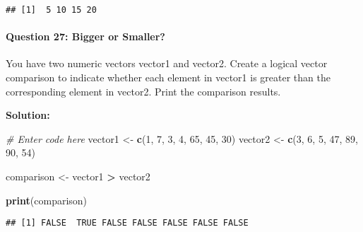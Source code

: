\documentclass[
]{article}
\newenvironment{Shaded}{\begin{snugshade}}{\end{snugshade}}
\newcommand{\CommentTok}[1]{\textcolor[rgb]{0.56,0.35,0.01}{\textit{#1}}}
\newcommand{\DecValTok}[1]{\textcolor[rgb]{0.00,0.00,0.81}{#1}}
\newcommand{\FunctionTok}[1]{\textcolor[rgb]{0.13,0.29,0.53}{\textbf{#1}}}
\newcommand{\NormalTok}[1]{#1}
\newcommand{\OtherTok}[1]{\textcolor[rgb]{0.56,0.35,0.01}{#1}}
\newcommand{\SpecialCharTok}[1]{\textcolor[rgb]{0.81,0.36,0.00}{\textbf{#1}}}
\begin{document}
\begin{verbatim}
## [1]  5 10 15 20
\end{verbatim}

\hypertarget{question-27-bigger-or-smaller}{%
\paragraph{Question 27: Bigger or
Smaller?}\label{question-27-bigger-or-smaller}}

You have two numeric vectors vector1 and vector2. Create a logical
vector comparison to indicate whether each element in vector1 is greater
than the corresponding element in vector2. Print the comparison results.

\textbf{Solution:}

\begin{Shaded}
\begin{Highlighting}[]
\CommentTok{\# Enter code here}
\NormalTok{vector1 }\OtherTok{\textless{}{-}} \FunctionTok{c}\NormalTok{(}\DecValTok{1}\NormalTok{, }\DecValTok{7}\NormalTok{, }\DecValTok{3}\NormalTok{, }\DecValTok{4}\NormalTok{, }\DecValTok{65}\NormalTok{, }\DecValTok{45}\NormalTok{, }\DecValTok{30}\NormalTok{)}
\NormalTok{vector2 }\OtherTok{\textless{}{-}} \FunctionTok{c}\NormalTok{(}\DecValTok{3}\NormalTok{, }\DecValTok{6}\NormalTok{, }\DecValTok{5}\NormalTok{, }\DecValTok{47}\NormalTok{, }\DecValTok{89}\NormalTok{, }\DecValTok{90}\NormalTok{, }\DecValTok{54}\NormalTok{)}

\NormalTok{comparison }\OtherTok{\textless{}{-}}\NormalTok{ vector1 }\SpecialCharTok{\textgreater{}}\NormalTok{ vector2}

\FunctionTok{print}\NormalTok{(comparison)}
\end{Highlighting}
\end{Shaded}

\begin{verbatim}
## [1] FALSE  TRUE FALSE FALSE FALSE FALSE FALSE
\end{verbatim}
\end{document}
